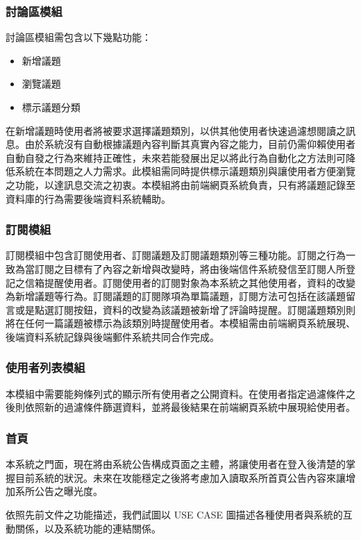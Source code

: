 \documentclass[11pt]{article}
\begin{document}
\subsubsection{討論區模組}
討論區模組需包含以下幾點功能：
\begin{itemize}
\item 新增議題
\item 瀏覽議題
\item 標示議題分類
\end{itemize}
在新增議題時使用者將被要求選擇議題類別，以供其他使用者快速過濾想閱讀之訊息。由於系統沒有自動根據議題內容判斷其真實內容之能力，目前仍需仰賴使用者自動自發之行為來維持正確性，未來若能發展出足以將此行為自動化之方法則可降低系統在本問題之人力需求。此模組需同時提供標示議題類別與讓使用者方便瀏覽之功能，以達訊息交流之初衷。本模組將由前端網頁系統負責，只有將議題記錄至資料庫的行為需要後端資料系統輔助。

\subsubsection{訂閱模組}
訂閱模組中包含訂閱使用者、訂閱議題及訂閱議題類別等三種功能。訂閱之行為一致為當訂閱之目標有了內容之新增與改變時，將由後端信件系統發信至訂閱人所登記之信箱提醒使用者。訂閱使用者的訂閱對象為本系統之其他使用者，資料的改變為新增議題等行為。訂閱議題的訂閱隊項為單篇議題，訂閱方法可包括在該議題留言或是點選訂閱按鈕，資料的改變為該議題被新增了評論時提醒。訂閱議題類別則將在任何一篇議題被標示為該類別時提醒使用者。本模組需由前端網頁系統展現、後端資料系統記錄與後端郵件系統共同合作完成。

\subsubsection{使用者列表模組}
本模組中需要能夠條列式的顯示所有使用者之公開資料。在使用者指定過濾條件之後則依照新的過濾條件篩選資料，並將最後結果在前端網頁系統中展現給使用者。

\subsubsection{首頁}
本系統之門面，現在將由系統公告構成頁面之主體，將讓使用者在登入後清楚的掌握目前系統的狀況。未來在攻能穩定之後將考慮加入讀取系所首頁公告內容來讓增加系所公告之曝光度。



依照先前文件之功能描述，我們試圖以 USE CASE 圖描述各種使用者與系統的互動關係，以及系統功能的連結關係。
\end{document}
